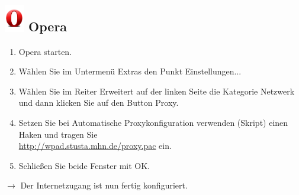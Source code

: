 \documentclass[a4paper,12pt]{scrartcl}
\begin{document}
\subsection*{\includegraphics[height=1.2cm,keepaspectratio]{Bilder/Opera_O} Opera}
\begin{enumerate}
    \item Opera starten.
    \item Wählen Sie im Untermenü Extras den Punkt Einstellungen...
    \item Wählen Sie im Reiter Erweitert auf der linken Seite die Kategorie Netzwerk und dann klicken Sie auf den Button Proxy.
    \item Setzen Sie bei Automatische Proxykonfiguration verwenden (Skript) einen Haken und tragen Sie \\ \url{http://wpad.stusta.mhn.de/proxy.pac} ein.
    \item Schließen Sie beide Fenster mit OK.
\end{enumerate}
$\rightarrow$ Der Internetzugang ist nun fertig konfiguriert.
\end{document}

